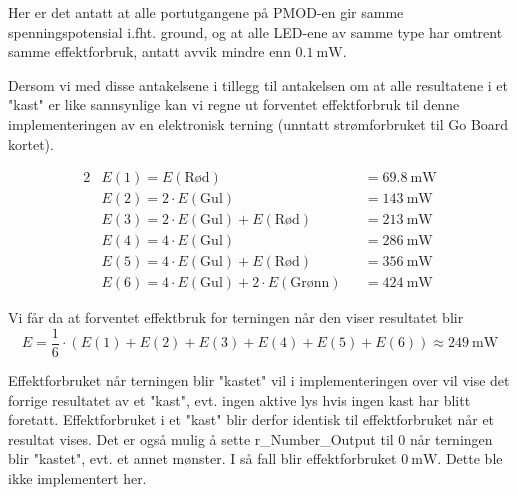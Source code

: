 Her er det antatt at alle portutgangene på PMOD-en gir samme spenningspotensial i.fht. ground,
og at alle LED-ene av samme type har omtrent samme effektforbruk, antatt avvik mindre enn $\SI{0.1}{\milli\watt}$.

Dersom vi med disse antakelsene i tillegg til antakelsen om at alle resultatene i et "kast" er like 
sannsynlige kan vi regne ut forventet effektforbruk til denne implementeringen av en elektronisk terning 
(unntatt strømforbruket til Go Board kortet).

\begin{alignat}{2}
    &E(1) = E(\text{Rød}) &&= \SI{69.8}{\milli\watt} \\
    &E(2) = 2 \cdot E(\text{Gul}) &&= \SI{143}{\milli\watt} \\
    &E(3) = 2 \cdot E(\text{Gul}) + E(\text{Rød}) &&= \SI{213}{\milli\watt} \\
    &E(4) = 4 \cdot E(\text{Gul}) &&= \SI{286}{\milli\watt} \\
    &E(5) = 4 \cdot E(\text{Gul}) + E(\text{Rød}) &&= \SI{356}{\milli\watt} \\
    &E(6) = 4 \cdot E(\text{Gul}) + 2 \cdot E(\text{Grønn}) &&= \SI{424}{\milli\watt}
\end{alignat}

Vi får da at forventet effektbruk for terningen når den viser resultatet blir 
\[
    E = \frac{1}{6} \cdot (E(1) + E(2) + E(3) + E(4) + E(5) + E(6)) \approx \SI{249}{\milli\watt} 
\]

Effektforbruket når terningen blir "kastet" vil i implementeringen over vil vise det forrige resultatet
av et "kast", evt. ingen aktive lys hvis ingen kast har blitt foretatt. Effektforbruket i et "kast" blir derfor 
identisk til effektforbruket når et resultat vises. Det er også mulig å sette r\_Number\_Output til 0 når terningen 
blir "kastet", evt. et annet mønster. I så fall blir effektforbruket $\SI{0}{\milli\watt}$. Dette ble ikke implementert her. 
